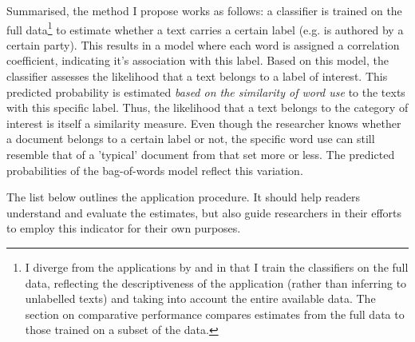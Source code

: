 \documentclass{article}
\begin{document}
Summarised, the method I propose works as follows: a classifier is trained on the full data\footnote{I diverge from the applications by \cite{Peterson2018} and \cite{Goet2019} in that I train the classifiers on the full data, reflecting the descriptiveness of the application (rather than inferring to unlabelled texts) and taking into account the entire available data. The section on comparative performance compares estimates from the full data to those trained on a subset of the data.} to estimate whether a text carries a certain label (e.g. is authored by a certain party). This results in a model where each word is assigned a correlation coefficient, indicating it's association with this label. Based on this model, the classifier assesses the likelihood that a text belongs to a label of interest. This predicted probability is estimated \textit{based on the similarity of word use} to the texts with this specific label. Thus, the likelihood that a text belongs to the category of interest is itself a similarity measure. Even though the researcher knows whether a document belongs to a certain label or not, the specific word use can still resemble that of a 'typical' document from that set more or less. The predicted probabilities of the bag-of-words model reflect this variation. \par

The list below outlines the application procedure. It should help readers understand and evaluate the estimates, but also guide researchers in their efforts to employ this indicator for their own purposes. \medskip
\end{document}
